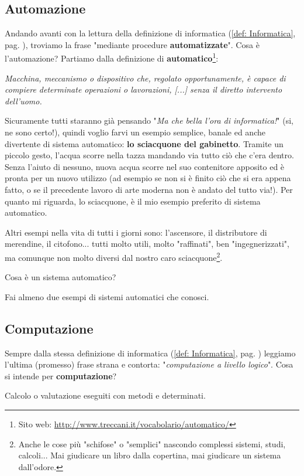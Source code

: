 \documentclass[12pt,fleqn,a4paper]{book} %
\begin{document}
    		\subsection{Automazione}
    		\label{sub: Automazione}
    			Andando avanti con la lettura della definizione di informatica (\ref{def: Informatica}, pag. \pageref{def: Informatica}), troviamo la frase "mediante procedure \textbf{automatizzate}". Cosa è l'automazione? Partiamo dalla definizione di \textbf{automatico}\footnote{Sito web: \url{http://www.treccani.it/vocabolario/automatico/}}:
    			\begin{definition}[Automatico]\label{def: Automatico}
    				\textit{Macchina, meccanismo o dispositivo che, regolato opportunamente, è capace di compiere determinate operazioni o lavorazioni, [...] senza il diretto intervento dell'uomo.}
    			\end{definition}
    		
    			Sicuramente tutti staranno già pensando "\textit{Ma che bella l'ora di informatica!}" (si, ne sono certo!), quindi voglio farvi un esempio semplice, banale ed anche divertente di sistema automatico: \textbf{lo sciacquone del gabinetto}. Tramite un piccolo gesto, l'acqua scorre nella tazza mandando via tutto ciò che c'era dentro. Senza l'aiuto di nessuno, nuova acqua scorre nel suo contenitore apposito ed è pronta per un nuovo utilizzo (ad esempio se non si è finito ciò che si era appena fatto, o se il precedente lavoro di arte moderna non è andato del tutto via!).
    			Per quanto mi riguarda, lo sciacquone, è il mio esempio preferito di sistema automatico.
    			
    			Altri esempi nella vita di tutti i giorni sono: l'ascensore, il distributore di merendine, il citofono... tutti molto utili, molto "raffinati", ben "ingegnerizzati", ma comunque non molto diversi dal nostro caro sciacquone\footnote{Anche le cose più "schifose" o "semplici" nascondo complessi sistemi, studi, calcoli... Mai giudicare un libro dalla copertina, mai giudicare un sistema dall'odore.}.
    			\begin{exercise}
    				Cosa è un sistema automatico?
    			\end{exercise}
    			\begin{exercise}
    				Fai almeno due esempi di sistemi automatici che conosci.
    			\end{exercise}
    			
    		\subsection{Computazione}
    		\label{sub: Computazione}
    			Sempre dalla stessa definizione di informatica (\ref{def: Informatica}, pag. \pageref{def: Informatica}) leggiamo l'ultima (promesso) frase strana e contorta: "\textit{computazione a livello logico}". Cosa si intende per \textbf{computazione}?
    			\begin{definition}[Computazione]\label{def: Computazione}
    				Calcolo o valutazione eseguiti con metodi e determinati.
    			\end{definition}
    		
\end{document}
